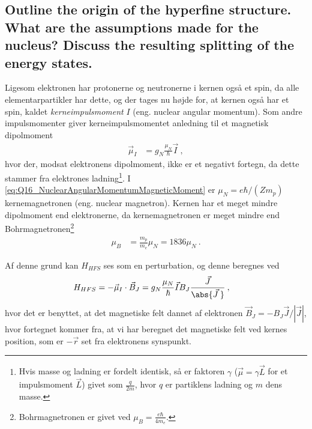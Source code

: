\subsection{Outline the origin of the hyperfine structure. What are the assumptions made for the nucleus? Discuss the resulting splitting of the energy states.}


Ligesom elektronen har protonerne og neutronerne i kernen også et spin, da alle elementarpartikler har dette, og der tages nu højde for, at kernen også har et spin, kaldet \emph{kerneimpulsmoment} $I$ (eng. nuclear angular momentum). Som andre impulsmomenter giver kerneimpulsmomentet anledning til et magnetisk dipolmoment
\begin{align} \label{eq:Q16_NuclearAngularMomentumMagneticMoment}
	\vec{\mu}_I &= g_N \frac{\mu_N}{\hbar} \vec{I} \: ,
\end{align}
hvor der, modsat elektronens dipolmoment, ikke er et negativt fortegn, da dette stammer fra elektrones ladning\footnote{Hvis masse og ladning er fordelt identisk, så er faktoren $\gamma$ ($\vec{\mu} = \gamma \vec{L}$ for et impulsmoment $\vec{L}$) givet som $\frac{q}{2m}$, hvor $q$ er partiklens ladning og $m$ dens masse.}. I \cref{eq:Q16_NuclearAngularMomentumMagneticMoment} er $\mu_N = e\hbar/(Zm_p)$ kernemagnetronen (eng. nuclear magnetron). Kernen har et meget mindre dipolmoment end elektronerne, da kernemagnetronen er meget mindre end Bohrmagnetronen\footnote{Bohrmagnetronen er givet ved $\mu_B = \frac{e\hbar}{4m_e}$.}
\begin{align}
	\mu_B &= \frac{m_p}{m_e}\mu_N = 1836 \mu_N \: .
\end{align}

Af denne grund kan $H_{HFS}$ ses som en perturbation, og denne beregnes ved
\begin{align} \label{eq:Q16_HyperFineStructureHamiltonStart}
	H_{HFS} &= -\vec{\mu}_I \cdot \vec{B}_J = g_N \frac{\mu_N}{\hbar} \vec{I} B_J \frac{\vec{J}}{\abs{\vec{J} \: }} \: ,
\end{align}
hvor det er benyttet, at det magnetiske felt dannet af elektronen $\vec{B}_J = - B_J \vec{J}/|\vec{J}|$, hvor fortegnet kommer fra, at vi har beregnet det magnetiske felt ved kernes position, som er $-\vec{r}$ set fra elektronens synspunkt.